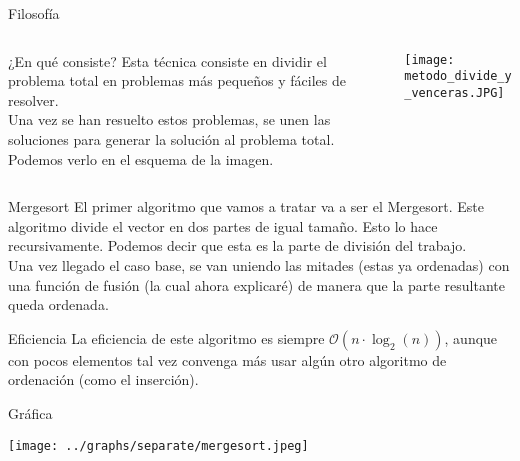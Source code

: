 \documentclass[compress]{beamer}
\begin{document}
\begin{frame}{Filosofía}
	\begin{columns}
		\begin{column}{4.3cm}
			\begin{block}{¿En qué consiste?}
			Esta técnica consiste en dividir el problema total en problemas más pequeños y fáciles de resolver.\\
			\vspace{0.20in}
			Una vez se han resuelto estos problemas, se unen las soluciones para generar la solución al problema total. Podemos verlo en el esquema de la imagen.
			\end{block}
		\end{column}
		\begin{column}{6cm}
			\begin{alertblock}{}
			\hspace*{+0.5cm}\texttt{[image: metodo\_divide\_y\_venceras.JPG]}
			\end{alertblock}
		\end{column}
	\end{columns}
\end{frame}

\begin{frame}{Mergesort}
El primer algoritmo que vamos a tratar va a ser el Mergesort. Este algoritmo divide el vector en dos partes de igual tamaño. Esto lo hace recursivamente. Podemos decir que esta es la parte de división del trabajo.\\
\vspace{0.20in}
Una vez llegado el caso base, se van uniendo las mitades (estas ya ordenadas) con una función de fusión (la cual ahora explicaré) de manera que la parte resultante queda ordenada.\\
\vspace{0.20in}
	\begin{block}{Eficiencia}
	La eficiencia de este algoritmo es siempre $\mathcal{O}(n\cdot\log_2(n))$, aunque con pocos elementos tal vez convenga más usar algún otro algoritmo de ordenación (como el inserción).
	\end{block}
\end{frame}

\begin{frame}{Gráfica}
	\begin{alertblock}{}
		\begin{center}
		\texttt{[image: ../graphs/separate/mergesort.jpeg]}
		\end{center}
	\end{alertblock}
\end{frame}
\end{document}
